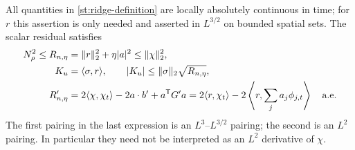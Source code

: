 \begin{theorem}
\label{st:residual}
All quantities in \eqref{st:ridge-definition} are locally absolutely
continuous in time; for $r$ this assertion is only needed and asserted
in $L^{3/2}$ on bounded spatial sets. The scalar residual satisfies
\begin{align}
 N_\rho^2\le R_{n,\eta}
 &=\|r\|_2^2+\eta|a|^2\le\|\chi\|_2^2,\label{st:bounds}\\
 K_u&=\langle\sigma,r\rangle,\qquad
 |K_u|\le\|\sigma\|_2\sqrt{R_{n,\eta}},\label{st:work}\\
 R_{n,\eta}'
 &=2\langle\chi,\chi_t\rangle-2a\cdot b'+a^{\mathsf T}G'a
  =2\langle r,\chi_t\rangle-2\left\langle r,\sum_j a_j\phi_{j,t}\right\rangle
 \quad\hbox{a.e.}\label{st:identity}
\end{align}
The first pairing in the last expression is an $L^3$--$L^{3/2}$
pairing; the second is an $L^2$ pairing. In particular they need not
be interpreted as an $L^2$ derivative of $\chi$.
\end{theorem}
